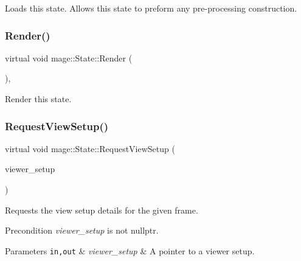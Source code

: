 Loads this state. Allows this state to preform any pre-\/processing construction. \hypertarget{classmage_1_1_state_a6e3b3f55bfd5be86a02783a2f76c9709}{}\label{classmage_1_1_state_a6e3b3f55bfd5be86a02783a2f76c9709} 
\subsubsection{\texorpdfstring{Render()}{Render()}}
{\footnotesize\ttfamily virtual void mage\+::\+State\+::\+Render (\begin{DoxyParamCaption}{ }\end{DoxyParamCaption})\hspace{0.3cm}{\ttfamily [protected]}, {\ttfamily [virtual]}}

Render this state. \hypertarget{classmage_1_1_state_a352431f7b9c067bc45f922b782d6b407}{}\label{classmage_1_1_state_a352431f7b9c067bc45f922b782d6b407} 
\subsubsection{\texorpdfstring{Request\+View\+Setup()}{RequestViewSetup()}}
{\footnotesize\ttfamily virtual void mage\+::\+State\+::\+Request\+View\+Setup (\begin{DoxyParamCaption}\item[{\hyperlink{structmage_1_1_viewer_setup}{Viewer\+Setup} $\ast$}]{viewer\+\_\+setup }\end{DoxyParamCaption})\hspace{0.3cm}{\ttfamily [virtual]}}

Requests the view setup details for the given frame.

\begin{DoxyPrecond}{Precondition}
{\itshape viewer\+\_\+setup} is not {\ttfamily nullptr}. 
\end{DoxyPrecond}

\begin{DoxyParams}[1]{Parameters}
\mbox{\tt in,out}  & {\em viewer\+\_\+setup} & A pointer to a viewer setup. \\
\hline
\end{DoxyParams}
\hypertarget{classmage_1_1_state_afbee8caa84e0c69ac5757f7e5e87317f}{}\label{classmage_1_1_state_afbee8caa84e0c69ac5757f7e5e87317f} 
